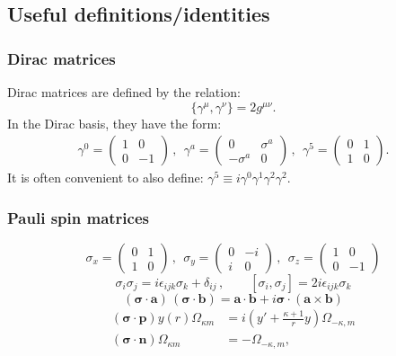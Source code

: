 \documentclass[10pt,twocolumn,a4paper]{article}%
\newcommand{\matr}[4]{\ensuremath{\begin{pmatrix}#1&#2\\#3&#4\end{pmatrix}}}	%
\renewcommand{\v}[1]{\ensuremath{\boldsymbol{#1}}}		%
\newcommand{\be}{\begin{equation}}
\newcommand{\ee}{\end{equation}}
\newcommand{\g}{\ensuremath{\gamma}}
\newcommand{\s}{\ensuremath{\sigma}}
\renewcommand{\k}{\ensuremath{\kappa}}
\begin{document}
\subsection{Useful definitions/identities}

\subsubsection*{Dirac matrices}\label{sec:DiracMatrix}

Dirac matrices are defined by the relation:
\be
\{\g^\mu,\g^\nu\} = 2g^{\mu\nu}.
\ee
In the Dirac basis, they have the form:
\begin{multline}
\g^0 = \matr{1}{0}{0}{-1} \, , ~~
\g^a = \matr{0}{\s^a}{-\s^a}{0} \, , ~~
\g^5 = \matr{0}{1}{1}{0}.
\end{multline}
It is often convenient to also define:
$\g^5 \equiv i\g^0\g^1\g^2\g^2$.

\subsubsection*{Pauli spin matrices}
\be
\s_x = \matr{0}{1}{1}{0} \, , ~~
\s_y = \matr{0}{-i}{i}{0} \, , ~~
\s_z = \matr{1}{0}{0}{-1}
\ee
\be
\s_i\s_j = i\epsilon_{ijk}\s_k + \delta_{ij} \, , \qquad
[\s_i,\s_j] = 2i\epsilon_{ijk}\s_k
\ee
\be
(\v{\s}\cdot\v{a})\,(\v{\s}\cdot\v{b}) = \v{a}\cdot\v{b} + i\v{\s}\cdot(\v{a}\times\v{b})
\ee
\begin{align}
(\v{\s}\cdot\v{p}) y(r)\Omega_{\k m} &= i\left(y' + \frac{\k+1}{r}y\right)\Omega_{-\k, m} \\
(\v{\s}\cdot\v{n}) \Omega_{\k m} &= -\Omega_{-\k, m},
\end{align}
\end{document}
